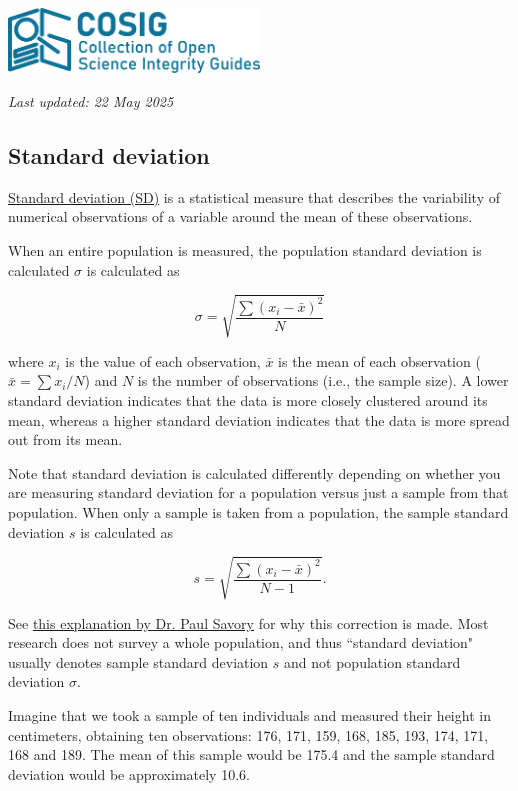 \documentclass[letterpaper, 12pt]{article}
\begin{document}
\flushleft\includegraphics[width=0.5\textwidth]{img/home/241017_final_logo_mockup.png}

\textit{Last updated: 22 May 2025}

\subsection*{Standard deviation}

\href{https://en.wikipedia.org/wiki/Standard_deviation}{Standard deviation (SD)} is a statistical measure that describes the variability of numerical observations of a variable around the mean of these observations.

When an entire population is measured, the population standard deviation is calculated $\sigma$ is calculated as 

$$
\sigma = \sqrt{\frac{\sum(x_i - \bar{x})^2}{N}}
$$

where $x_i$ is the value of each observation, $\bar{x}$ is the mean of each observation ($\bar{x} = \sum x_i / N$) and $N$ is the number of observations (i.e., the sample size). A lower standard deviation indicates that the data is more closely clustered around its mean, whereas a higher standard deviation indicates that the data is more spread out from its mean.

Note that standard deviation is calculated differently depending on whether you are measuring standard deviation for a population versus just a sample from that population. When only a sample is taken from a population, the sample standard deviation $s$ is calculated as 

$$
s = \sqrt{\frac{\sum(x_i - \bar{x})^2}{N-1}}.
$$

See \href{https://digitalcommons.unl.edu/cgi/viewcontent.cgi?article=1008&context=imseteach}{this explanation by Dr. Paul Savory} for why this correction is made. Most research does not survey a whole population, and thus ``standard deviation" usually denotes sample standard deviation $s$ and not population standard deviation $\sigma$.

Imagine that we took a sample of ten individuals and measured their height in centimeters, obtaining ten observations: 176, 171, 159, 168, 185, 193, 174, 171, 168 and 189. The mean of this sample would be 175.4 and the sample standard deviation would be approximately 10.6.
\end{document}
